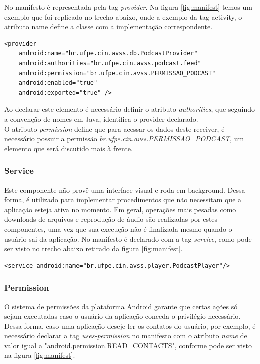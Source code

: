 \documentclass[a4paper,12pt]{article}
\begin{document}
No manifesto é representada pela tag \textit{provider}. Na figura \ref{fig:manifest} temos um exemplo que foi replicado no trecho abaixo, onde a exemplo da tag activity, o atributo name define a classe com a implementação correspondente.
{\fontsize{9pt}{12pt}
\begin{verbatim}
<provider
    android:name="br.ufpe.cin.avss.db.PodcastProvider"
    android:authorities="br.ufpe.cin.avss.podcast.feed"
    android:permission="br.ufpe.cin.avss.PERMISSAO_PODCAST"
    android:enabled="true"
    android:exported="true" />
\end{verbatim}
}

Ao declarar este elemento é necessário definir o atributo \textit{authorities}, que seguindo a convenção de nomes em Java, identifica o provider declarado.\\

O atributo \textit{permission} define que para acessar os dados deste receiver, é necessário possuir a permissão \textit{br.ufpe.cin.avss.PERMISSAO\_PODCAST}, um elemento que será discutido mais à frente.




\subsubsection{Service}



Este componente não provê uma interface visual e roda em background. Dessa forma, é utilizado para implementar procedimentos  que não necessitam que a aplicação esteja ativa no momento. Em geral, operações mais pesadas como downloads de arquivos e reprodução de áudio são realizadas por estes componentes, uma vez que sua execução não é finalizada mesmo quando o usuário sai da aplicação. No manifesto é declarado com a tag \textit{service}, como pode ser visto no trecho abaixo retirado da figura \ref{fig:manifest}.
{\fontsize{9pt}{12pt}
\begin{verbatim}
<service android:name="br.ufpe.cin.avss.player.PodcastPlayer"/>
\end{verbatim}
}

\subsubsection{Permission}
O sistema de permissões da plataforma Android garante que certas ações só sejam executadas caso o usuário da aplicação conceda o privilégio necessário. Dessa forma, caso uma aplicação deseje ler os contatos do usuário, por exemplo, é necessário declarar a tag \textit{uses-permission} no manifesto com o atributo \textit{name} de valor igual a "android.permission.READ\_CONTACTS", conforme pode ser visto na figura \ref{fig:manifest}.
\end{document}
